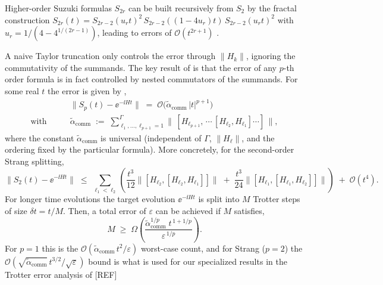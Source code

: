 Higher-order Suzuki formulas $S_{2r}$ can be built recursively from $S_2$ by the fractal construction $S_{2r}(t) = S_{2r-2}(u_r t)^2\,S_{2r-2}((1-4u_r)t)\,S_{2r-2}(u_r t)^2$ with $u_r = 1/(4 - 4^{1/(2r-1)})$, leading to errors of $\mathcal{O}(t^{2r+1})$ \cite{childs2021theory}.

A naive Taylor truncation only controls the error through $\|H_k\|$, ignoring the commutativity of the summands. The key result of \cite{childs2021theory} is that the error of any $p$-th order formula is in fact controlled by nested commutators of the summands. For some real $t$ the error is given by \cite[Theorem 6]{childs2021theory}, 
\begin{equation} \label{eq:childs-comm-bound}
    \begin{split}
        &\bigl\|S_p(t) - \ee^{-\ii H t}\bigr\|
        \;=\; \mathcal{O}\!\bigl(\tilde\alpha_{\mathrm{comm}}\,|t|^{p+1}\bigr) \\ 
        \text{with}\qquad &\tilde\alpha_{\mathrm{comm}}
        \;:=\; \sum_{\ell_1,\dots,\ell_{p+1}=1}^{\Gamma}
        \bigl\|\,[H_{\ell_{p+1}},\,\cdots\,[H_{\ell_2},H_{\ell_1}]\cdots]\,\bigr\|,
    \end{split}
\end{equation}
where the constant $\tilde{\alpha}_\mathrm{comm}$ is universal (independent of $\Gamma$, $\|H_\ell\|$, and the ordering fixed by the particular formula). More concretely, for the second-order Strang splitting,
\begin{equation} \label{eq:strang-explicit-error}
        \bigl\|S_2(t) - \ee^{-\ii H t}\bigr\|
    \;\leq\; \sum_{\ell_1 < \ell_2}\!\left(
    \frac{t^3}{12}\bigl\|[H_{\ell_2},[H_{\ell_2},H_{\ell_1}]]\bigr\|
    \;+\; \frac{t^3}{24}\bigl\|[H_{\ell_1},[H_{\ell_1},H_{\ell_2}]]\bigr\|
    \right)
    \;+\; \mathcal{O}(t^4).
\end{equation}
For longer time evolutions the target evolution $\ee^{-\ii H t}$ is split into $M$ Trotter steps of size $\delta t = t / M $. Then, a total error of $\varepsilon$ can be achieved if $M$ satisfies, 
\begin{equation} \label{eq:trott-num-bound}
    M \;\geq\; \Omega\!\left(\frac{\tilde\alpha_{\mathrm{comm}}^{1/p}\;t^{\,1+1/p}}{\varepsilon^{\,1/p}}\right).
\end{equation}
For $p=1$ this is the $\mathcal{O}(\tilde\alpha_{\mathrm{comm}}\, t^2/\varepsilon)$ worst-case count, and for Strang ($p = 2$) the $\mathcal{O}(\sqrt{\tilde\alpha_{\mathrm{comm}}}\, t^{3/2}/\sqrt{\varepsilon})$ bound is what is used for our specialized results in the Trotter error analysis of [REF] 

